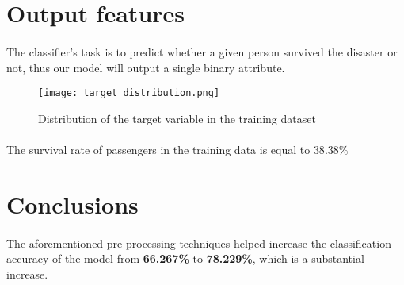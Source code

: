 \documentclass{article}
\begin{document}
\section{Output features}
\paragraph{}The classifier's task is to predict whether a given person survived the disaster or not, thus our model will output a single binary attribute.
\begin{figure}[htb]
    \centering
    \texttt{[image: target\_distribution.png]}
    \caption{Distribution of the target variable in the training dataset}
    \label{fig:enter-label}
\end{figure}
\paragraph{}The survival rate of passengers in the training data is equal to $38.\overline{38}\%$
\section{Conclusions}
\paragraph{}The aforementioned pre-processing techniques helped increase the classification accuracy of the model from \textbf{66.267\%} to \textbf{78.229\%}, which is a substantial increase. 
\end{document}
